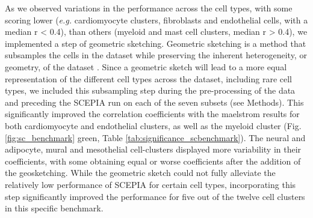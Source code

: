 As we observed variations in the performance across the cell types, with some scoring lower (\textit{e.g.} cardiomyocyte clusters, fibroblasts and endothelial cells, with a median r < 0.4), than others (myeloid and mast cell clusters, median r > 0.4), we implemented a step of geometric sketching. Geometric sketching is a method that subsamples the cells in the dataset while preserving the inherent heterogeneity, or geometry, of the dataset \cite{Hie2019}. Since a geometric sketch will lead to a more equal representation of the different cell types across the dataset, including rare cell types, we included this subsampling step during the pre-processing of the data and preceding the SCEPIA run on each of the seven subsets (see Methods). This significantly improved the correlation coefficients with the maelstrom results for both cardiomyocyte and endothelial clusters, as well as the myeloid cluster (Fig. \ref{fig:sc_benchmark} green, Table \ref{tab:significance_scbenchmark}). The neural and adipocyte, mural and mesothelial cell-clusters displayed more variability in their coefficients, with some obtaining equal or worse coefficients after the addition of the geosketching. While the geometric sketch could not fully alleviate the relatively low performance of SCEPIA for certain cell types, incorporating this step significantly improved the performance for five out of the twelve cell clusters in this specific benchmark. 

